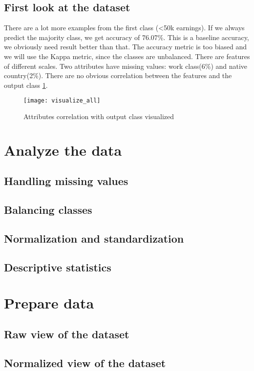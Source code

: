 \section{First look at the dataset}
There are a lot more examples from the first class (<50k earnings). If we always predict the majority class, we get accuracy of 76.07\%. This is a baseline accuracy, we obviously need result better than that. The accuracy metric is too biased and we will use the Kappa metric, since the classes are unbalanced. There are features of different scales. Two attributes have missing values: work class(6\%) and native country(2\%). There are no obvious correlation between the features and the output class \ref{fig:visual}.
\begin{figure}
    \centering
    \texttt{[image: visualize\_all]}
    \caption{Attributes correlation with output class visualized}
    \label{fig:visual}
\end{figure}

\chapter{Analyze the data}
\section{Handling missing values}
\section{Balancing classes}
\section{Normalization and standardization}
\section{Descriptive statistics}

\chapter{Prepare data}
\section{Raw view of the dataset}
\section{Normalized view of the dataset}
